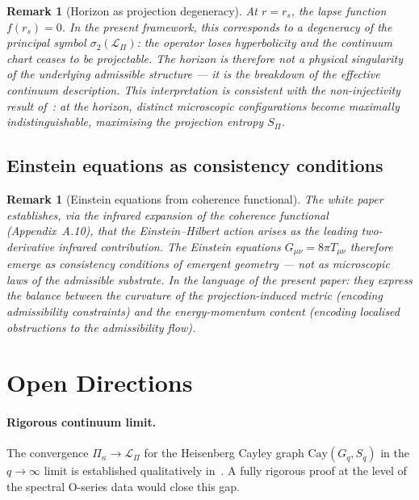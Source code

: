 \documentclass[11pt,a4paper]{article}
\newtheorem{remark}[theorem]{Remark}
\begin{document}
      \begin{remark}[Horizon as projection degeneracy]
        At $r = r_s$, the lapse function $f(r_s) = 0$.
        In the present framework, this corresponds to a degeneracy of the principal
        symbol $\sigma_2(\mathcal{L}_\Pi)$: the operator loses hyperbolicity and
        the continuum chart ceases to be projectable.
        The horizon is therefore not a physical singularity of the underlying
        admissible structure — it is the breakdown of the effective continuum
        description.
        This interpretation is consistent with the non-injectivity result of~\cite{ENI}:
        at the horizon, distinct microscopic configurations become maximally
        indistinguishable, maximising the projection entropy $S_{\Pi}$.
      \end{remark}

    \subsection{Einstein equations as consistency conditions}

      \begin{remark}[Einstein equations from coherence functional]
        The white paper~\cite{Cosmochrony} establishes, via the infrared expansion of
        the coherence functional (Appendix~A.10), that the Einstein--Hilbert action
        arises as the leading two-derivative infrared contribution.
        The Einstein equations $G_{\mu\nu} = 8\pi T_{\mu\nu}$ therefore emerge as
        consistency conditions of emergent geometry — not as microscopic laws of the
        admissible substrate.
        In the language of the present paper: they express the balance between the
        curvature of the projection-induced metric (encoding admissibility constraints)
        and the energy-momentum content (encoding localised obstructions to the
        admissibility flow).
      \end{remark}

  \section{Open Directions}
    \label{sec:open}

    \paragraph{Rigorous continuum limit.}
      The convergence $\Pi_n \to \mathcal{L}_\Pi$ for the Heisenberg Cayley graph
      $\mathrm{Cay}(G_q, S_q)$ in the $q \to \infty$ limit is established qualitatively
      in~\cite{FoundationM}.
      A fully rigorous proof at the level of the spectral O-series data would close
      this gap.
\end{document}
